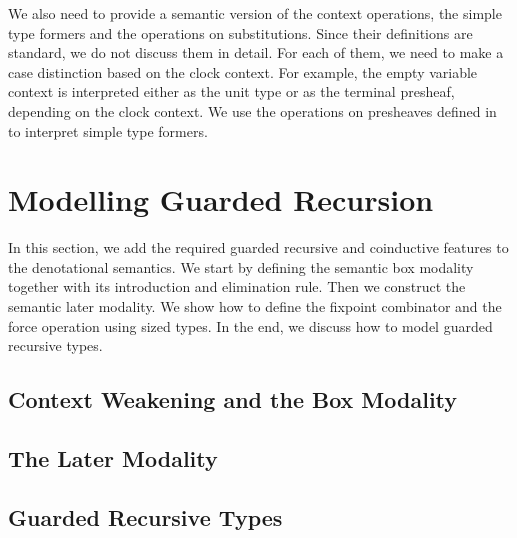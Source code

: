 \documentclass[a4paper,UKenglish,cleveref, autoref,numberwithinsect]{lipics-v2019}
\newcommand{\IC}{\AgdaInductiveConstructor}
\begin{document}
We also need to provide a semantic version of 
the context operations, the simple type formers and the operations on substitutions.
Since their definitions are standard, we do not discuss them in detail.
For each of them, we need to make a case distinction based on the clock context.
For example, the empty variable context \IC{•} is interpreted either as the unit type
or as the terminal presheaf, depending on the clock context.
We use the operations on presheaves defined in  to interpret simple type formers.


\section{Modelling Guarded Recursion}
\label{sec:guarded}
In this section, we add the required guarded
recursive and coinductive features to the denotational semantics.
We start by defining the semantic box modality together with its
introduction and elimination rule. Then we construct the semantic
later modality. We show how to define the fixpoint combinator and the
force operation using sized types. In the end, we discuss how to model
guarded recursive types.

\subsection{Context Weakening and the Box Modality}



\subsection{The Later Modality}
\label{sec:later}




\subsection{Guarded Recursive Types}
\label{sec:grt}

\end{document}
